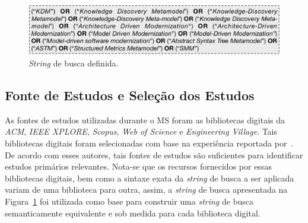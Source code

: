 \begin{figure}[h]
 \caption{\textit{String} de busca definida.}
 \label{fig:string_de_busca}
 \centering
 \includegraphics[scale=0.6]{images/searchStringMS}
 \fautor
\end{figure}

\subsection{Fonte de Estudos e Seleção dos Estudos}\label{subsec:fonte_de_estudo_e_selecao}

As fontes de estudos utilizadas durante o MS foram as bibliotecas digitais da \textit{ACM}, 
\textit{IEEE XPLORE}, \textit{Scopus}, \textit{Web of Science} e \textit{Engineering Village}. Tais bibliotecas digitais foram selecionadas com base na experiência reportada por~. De acordo com esses autores, tais fontes de estudos são suficientes para identificar estudos primários relevantes. Nota-se que os recursos fornecidos por essas bibliotecas digitais, bem como a sintaxe exata da \textit{string} de busca a ser aplicada variam de uma biblioteca para outra, assim, a \textit{string} de busca apresentada na Figura~\ref{fig:string_de_busca} foi utilizada como base para construir uma \textit{string} de busca semanticamente equivalente e sob medida para cada biblioteca digital. %


 
 
 
